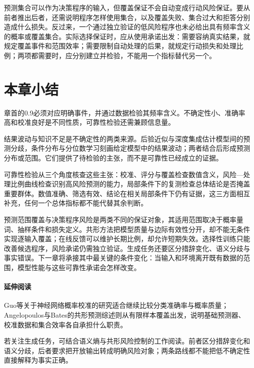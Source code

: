 预测集合可以作为决策程序的输入，但覆盖保证不会自动变成行动风险保证。要从前者推出后者，还需说明程序怎样使用集合，以及覆盖失败、集合过大和拒答分别造成什么损失。反过来，一个通过独立验证的低风险程序也未必给出具有频率含义的概率或覆盖集合。实际选择保证时，应从使用承诺出发：需要容纳真实结果，就规定覆盖事件和范围效率；需要限制自动处理的后果，就规定行动损失和处理比例；两项都需要时，应分别建立并检验，不能用一个指标替代另一个。

\section{本章小结}
\label{sec:reliability-summary}

章首的0.9必须对应明确事件，并通过数据检验其频率含义。不确定性小、准确率高和校准良好是不同性质，可靠性检验还需兼顾信息量。

结果波动与知识不足是不确定性的两类来源。后验近似与深度集成估计模型间的预测分歧，条件分布与分位数学习刻画给定模型中的结果波动；两者结合后形成预测分布或范围。它们提供了待检验的主张，而不是可靠性已经成立的证据。

可靠性检验从三个角度核查这些主张：校准、评分与覆盖检查数值含义，风险—处理比例曲线检查识别高风险预测的能力，局部条件下的复测检查总体结论是否掩盖重要群体。数值准确、筛选有效、结论在相关局部条件下仍有证据，这三方面相互补充，任何一个总体指标都不能代替其余判断。

预测范围覆盖与决策程序风险是两类不同的保证对象，其适用范围取决于概率量词、抽样条件和损失定义。共形方法把模型质量与边际有效性分开，却不能无条件实现逐输入覆盖；在线反馈可以维护长期比例，却允许短期失效。选择性训练只能改善候选程序，风险承诺仍需独立验证。生成任务还要区分措辞变化、语义分歧与事实错误。下一章将承接其中最关键的条件变化：当输入和环境离开既有数据的范围，模型性能与这些可靠性承诺会怎样改变。

\paragraph{延伸阅读}

Guo等关于神经网络概率校准的研究适合继续比较分类准确率与概率质量；Angelopoulos与Bates的共形预测综述则从有限样本覆盖出发，说明基础预测器、校准数据和集合效率各自承担什么职责。

若关注生成任务，可结合语义熵与共形风险控制的工作阅读。前者区分措辞变化和语义分歧，后者要求把开放输出转成明确风险对象；两条路线都不能把低不确定性直接解释为事实正确。
